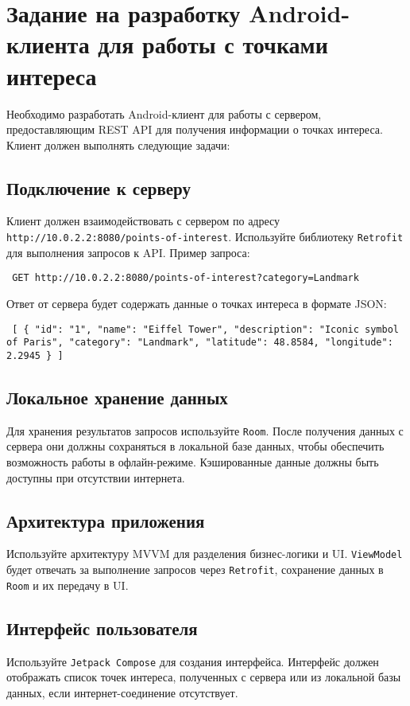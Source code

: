 \section{Задание на разработку Android-клиента для работы с точками интереса}

Необходимо разработать Android-клиент для работы с сервером, предоставляющим REST API для получения информации о точках интереса. Клиент должен выполнять следующие задачи:

\subsection{Подключение к серверу} Клиент должен взаимодействовать с сервером по адресу \texttt{http://10.0.2.2:8080/points-of-interest}. Используйте библиотеку \texttt{Retrofit} для выполнения запросов к API. Пример запроса:

\begin{verbatim} GET http://10.0.2.2:8080/points-of-interest?category=Landmark \end{verbatim}

Ответ от сервера будет содержать данные о точках интереса в формате JSON:

\begin{verbatim} [ { "id": "1", "name": "Eiffel Tower", "description": "Iconic symbol of Paris", "category": "Landmark", "latitude": 48.8584, "longitude": 2.2945 } ] \end{verbatim}

\subsection{Локальное хранение данных} Для хранения результатов запросов используйте \texttt{Room}. После получения данных с сервера они должны сохраняться в локальной базе данных, чтобы обеспечить возможность работы в офлайн-режиме. Кэшированные данные должны быть доступны при отсутствии интернета.

\subsection{Архитектура приложения} Используйте архитектуру MVVM для разделения бизнес-логики и UI. \texttt{ViewModel} будет отвечать за выполнение запросов через \texttt{Retrofit}, сохранение данных в \texttt{Room} и их передачу в UI.

\subsection{Интерфейс пользователя} Используйте \texttt{Jetpack Compose} для создания интерфейса. Интерфейс должен отображать список точек интереса, полученных с сервера или из локальной базы данных, если интернет-соединение отсутствует.

